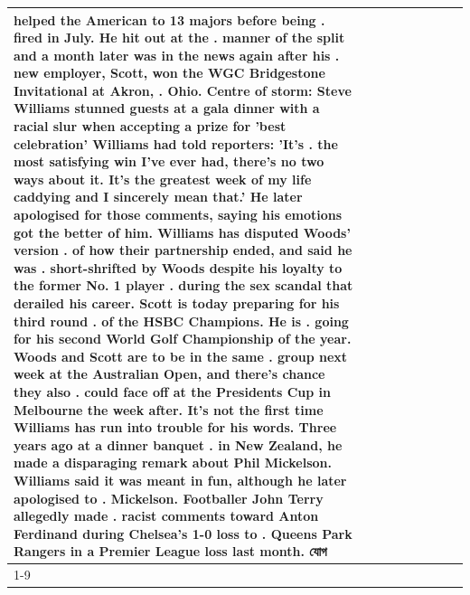 \begin{table}[H]
\begin{tabular}{lllrlllll}
helped the American to 13 majors before being . fired in July. He hit out at the . manner of the split and a month later was in the news again after his . new employer, Scott, won the WGC Bridgestone Invitational at Akron, . Ohio. Centre of storm: Steve Williams stunned guests at a gala dinner with a racial slur when accepting a prize for 'best celebration' Williams had told reporters: 'It's . the most satisfying win I've ever had, there's no two ways about it. It's the greatest week of my life caddying and I sincerely mean that.' He later apologised for those comments, saying his emotions got the better of him. Williams has disputed Woods' version . of how their partnership ended, and said he was . short-shrifted by Woods despite his loyalty to the former No. 1 player . during the sex scandal that derailed his career. Scott is today preparing for his third round . of the HSBC Champions. He is . going for his second World Golf Championship of the year. Woods and Scott are to be in the same . group next week at the Australian Open, and there's chance they also . could face off at the Presidents Cup in Melbourne the week after. It's not the first time Williams has run into trouble for his words. Three years ago at a dinner banquet . in New Zealand, he made a disparaging remark about Phil Mickelson. Williams said it was meant in fun, although he later apologised to . Mickelson. Footballer John Terry allegedly made . racist comments toward Anton Ferdinand during Chelsea's 1-0 loss to . Queens Park Rangers in a Premier League loss last month. যোগ \\
\cline{1-9}

\end{tabular}
\end{table}
